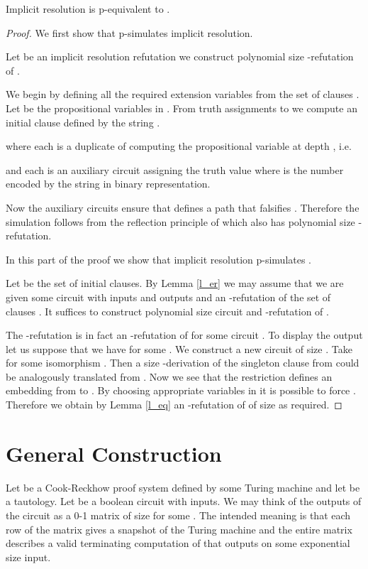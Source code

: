 \documentclass{LMCS}
\theoremstyle{plain}\newtheorem{satz}[thm]{Satz}
\begin{document}
\begin{thm}
\label{t_main}
Implicit resolution is p-equivalent to .
\begin{proof}
We first show that  p-simulates implicit resolution.

Let  be an implicit resolution refutation we construct polynomial size -refutation of .

We begin by defining all the required extension variables from the set of clauses . Let  be the propositional variables in . From truth assignments to  we compute an initial clause defined by the string .

where each  is a duplicate of  computing the propositional variable at depth , i.e.

and each  is an auxiliary circuit assigning  the truth value  where  is the number encoded by the string  in binary representation.

Now the auxiliary circuits  ensure that  defines a path that falsifies .
Therefore the simulation follows from the reflection principle of  which also has polynomial size -refutation.

In this part of the proof we show that implicit resolution p-simulates .

Let  be the set of initial clauses. By Lemma \ref{l_er} we may assume that we are given some circuit  with inputs  and outputs  and an -refutation  of the set of clauses . It suffices to construct polynomial size circuit  and -refutation  of .

The -refutation  is in fact an -refutation of  for some circuit . To display the output  let us suppose that we have  for some . We construct a new circuit  of size . Take  for some isomorphism . Then a  size -derivation of the singleton clause  from  could be analogously translated from . Now we see that the restriction  defines an embedding from  to . By choosing appropriate variables in  it is possible to force . Therefore we obtain by Lemma \ref{l_eq} an -refutation of  of size  as required.
\end{proof}
\end{thm}

\section{General Construction}
\label{s_gen}

Let  be a Cook-Reckhow proof system defined by some Turing machine  and let  be a tautology. Let  be a boolean circuit with  inputs. We may think of the outputs of the circuit  as a 0-1 matrix of size  for some . The intended meaning is that each row of the matrix gives a snapshot of the Turing machine  and the entire matrix describes a valid terminating computation of  that outputs  on some exponential size input.
\end{document}
